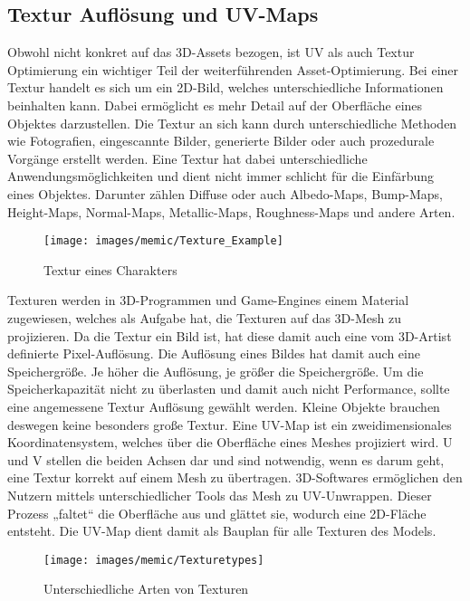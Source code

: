 \subsection{Textur Auflösung und UV-Maps}

Obwohl nicht konkret auf das 3D-Assets bezogen, ist UV als auch Textur Optimierung ein wichtiger Teil der weiterführenden Asset-Optimierung. Bei einer Textur handelt es sich um ein 2D-Bild, welches unterschiedliche Informationen beinhalten kann. 
Dabei ermöglicht es mehr Detail auf der Oberfläche eines Objektes darzustellen. Die Textur an sich kann durch unterschiedliche Methoden wie Fotografien, eingescannte Bilder, generierte Bilder oder auch prozedurale Vorgänge erstellt werden. Eine Textur hat dabei unterschiedliche Anwendungsmöglichkeiten und dient nicht immer schlicht für die Einfärbung eines Objektes. Darunter zählen Diffuse oder auch Albedo-Maps, Bump-Maps, Height-Maps, Normal-Maps, Metallic-Maps, Roughness-Maps und andere Arten.\cite[S.18]{_3d_modeling_pipline}

\begin{figure}[H]
	\centering
	\texttt{[image: images/memic/Texture\_Example]}
	\caption{Textur eines Charakters}
\end{figure}
\cite{_textureExample}

Texturen werden in 3D-Programmen und Game-Engines einem Material zugewiesen, welches als Aufgabe hat, die Texturen auf das 3D-Mesh zu projizieren. Da die Textur ein Bild ist, hat diese damit auch eine vom 3D-Artist definierte Pixel-Auflösung. Die Auflösung eines Bildes hat damit auch eine Speichergröße. Je höher die Auflösung, je größer die Speichergröße. Um die Speicherkapazität nicht zu überlasten und damit auch nicht Performance, sollte eine angemessene Textur Auflösung gewählt werden.\cite[S.141]{_unity_game_optimization} Kleine Objekte brauchen deswegen keine besonders große Textur.
Eine UV-Map ist ein zweidimensionales Koordinatensystem, welches über die Oberfläche eines Meshes projiziert wird. U und V stellen die beiden Achsen dar und sind notwendig, wenn es darum geht, eine Textur korrekt auf einem Mesh zu übertragen.\cite{_the_complete_guide_to_blender} 3D-Softwares ermöglichen den Nutzern mittels unterschiedlicher Tools das Mesh zu UV-Unwrappen. Dieser Prozess „faltet“ die Oberfläche aus und glättet sie, wodurch eine 2D-Fläche entsteht. Die UV-Map dient damit als Bauplan für alle Texturen des Models.\cite[79]{_3d_game_textures}

\begin{figure}[H]
	\centering
	\texttt{[image: images/memic/Texturetypes]}
	\caption{Unterschiedliche Arten von Texturen}
\end{figure}
\Cite{_textureTypes}

